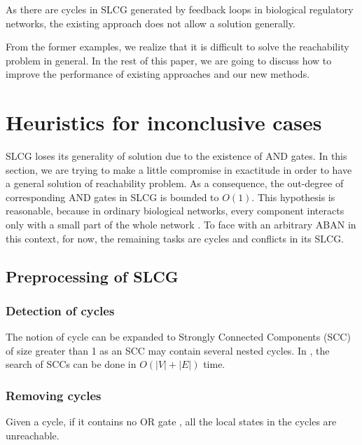 \documentclass[runningheads]{llncs}
\begin{document}
As there are cycles in SLCG generated by feedback loops in biological regulatory networks, the existing approach does not allow a solution generally.

From the former examples, we realize that it is difficult to solve the reachability problem in general. 
In the rest of this paper, we are going to discuss how to improve the performance of existing approaches and our new methods. 

\section{Heuristics for inconclusive cases}\label{sect:4}
SLCG loses its generality of solution due to the existence of AND gates.
In this section, we are trying to make a little compromise in exactitude in order to have a general solution of reachability problem. 
As a consequence, the out-degree of corresponding AND gates in SLCG is bounded to $O(1)$.
This hypothesis is reasonable, because in ordinary biological networks, every component interacts only with a small part of the whole network \cite{akutsu2007control}.
To face with an arbitrary ABAN in this context, for now, the remaining tasks are cycles and conflicts in its SLCG.
\subsection{Preprocessing of SLCG}\label{sectprecond}
\subsubsection{Detection of cycles}
The notion of cycle can be expanded to Strongly Connected Components (SCC) of size greater than 1 as an SCC may contain several nested cycles. 
In \cite{tarjan1972}, the search of SCCs can be done in $O(|V|+|E|)$ time. 

\subsubsection{Removing cycles}
\begin{theorem}\label{cycletheo}
Given a cycle, if it contains no OR gate%
, all the local states in the cycles are unreachable.
\end{theorem}
\end{document}
